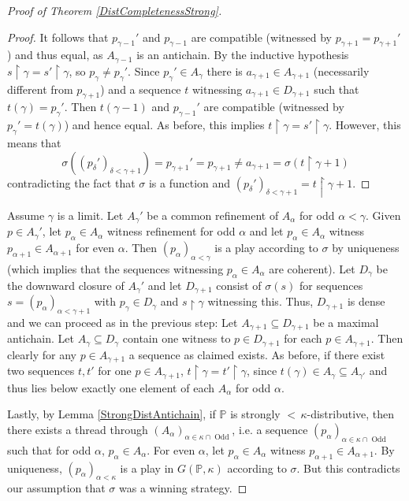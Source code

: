 \documentclass[12pt]{amsart}
\theoremstyle{definition}
\theoremstyle{remark}
\theoremstyle{plain}
\numberwithin{mydef}{section}
\DeclareMathOperator{\Odd}{Odd}
\newcommand{\dP}{\mathbb{P}}
\newcommand{\uhr}{\upharpoonright}
\begin{document}
\begin{proof}[Proof of Theorem \ref{DistCompletenessStrong}]
\begin{proof}
			It follows that $p_{\gamma-1}'$ and $p_{\gamma-1}$ are compatible (witnessed by $p_{\gamma+1}=p_{\gamma+1}'$) and thus equal, as $A_{\gamma-1}$ is an antichain. By the inductive hypothesis $s\uhr\gamma=s'\uhr\gamma$, so $p_{\gamma}\neq p_{\gamma}'$. Since $p_{\gamma}'\in A_{\gamma}$ there is $a_{\gamma+1}\in A_{\gamma+1}$ (necessarily different from $p_{\gamma+1}$) and a sequence $t$ witnessing $a_{\gamma+1}\in D_{\gamma+1}$ such that $t(\gamma)=p_{\gamma}'$. Then $t(\gamma-1)$ and $p_{\gamma-1}'$ are compatible (witnessed by $p_{\gamma}'=t(\gamma)$) and hence equal. As before, this implies $t\uhr\gamma=s'\uhr\gamma$. However, this means that
			$$\sigma((p_{\delta}')_{\delta<\gamma+1})=p_{\gamma+1}'=p_{\gamma+1}\neq a_{\gamma+1}=\sigma(t\uhr\gamma+1)$$
			contradicting the fact that $\sigma$ is a function and $(p_{\delta}')_{\delta<\gamma+1}=t\uhr\gamma+1$.
		\end{proof}
		Assume $\gamma$ is a limit. Let $A_{\gamma}'$ be a common refinement of $A_{\alpha}$ for odd $\alpha<\gamma$. Given $p\in A_{\gamma}'$, let $p_{\alpha}\in A_{\alpha}$ witness refinement for odd $\alpha$ and let $p_{\alpha}\in A_{\alpha}$ witness $p_{\alpha+1}\in A_{\alpha+1}$ for even $\alpha$. Then $(p_{\alpha})_{\alpha<\gamma}$ is a play according to $\sigma$ by uniqueness (which implies that the sequences witnessing $p_{\alpha}\in A_{\alpha}$ are coherent). Let $D_{\gamma}$ be the downward closure of $A_{\gamma}'$ and let $D_{\gamma+1}$ consist of $\sigma(s)$ for sequences $s=(p_{\alpha})_{\alpha<\gamma+1}$ with $p_{\gamma}\in D_{\gamma}$ and $s\uhr\gamma$ witnessing this. Thus, $D_{\gamma+1}$ is dense and we can proceed as in the previous step: Let $A_{\gamma+1}\subseteq D_{\gamma+1}$ be a maximal antichain. Let $A_{\gamma}\subseteq D_{\gamma}$ contain one witness to $p\in D_{\gamma+1}$ for each $p\in A_{\gamma+1}$. Then clearly for any $p\in A_{\gamma+1}$ a sequence as claimed exists. As before, if there exist two sequences $t,t'$ for one $p\in A_{\gamma+1}$, $t\uhr\gamma=t'\uhr\gamma$, since $t(\gamma)\in A_{\gamma}\subseteq A_{\gamma'}$ and thus lies below exactly one element of each $A_{\alpha}$ for odd $\alpha$.
		
		Lastly, by Lemma \ref{StrongDistAntichain}, if $\dP$ is strongly ${<}\,\kappa$-distributive, then there exists a thread through $(A_{\alpha})_{\alpha\in\kappa\cap\Odd}$, i.e. a sequence $(p_{\alpha})_{\alpha\in\kappa\cap\Odd}$ such that for odd $\alpha$, $p_{\alpha}\in A_{\alpha}$. For even $\alpha$, let $p_{\alpha}\in A_{\alpha}$ witness $p_{\alpha+1}\in A_{\alpha+1}$. By uniqueness, $(p_{\alpha})_{\alpha<\kappa}$ is a play in $G(\dP,\kappa)$ according to $\sigma$. But this contradicts our assumption that $\sigma$ was a winning strategy.
	\end{proof}
	
\end{document}
